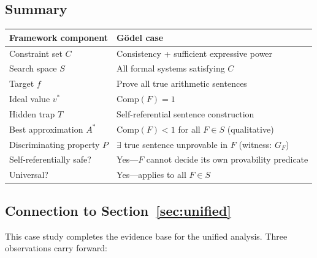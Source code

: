\documentclass[11pt,a4paper]{article}
\theoremstyle{plain}
\theoremstyle{definition}
\theoremstyle{remark}
\newcommand{\Comp}{\mathrm{Comp}}
\begin{document}
\subsection{Summary}

\begin{table}[h]
\centering
\begin{tabular}{@{}ll@{}}
\toprule
Framework component & G\"{o}del case \\
\midrule
Constraint set $C$ & Consistency + sufficient expressive power \\
Search space $S$ & All formal systems satisfying $C$ \\
Target $f$ & Prove all true arithmetic sentences \\
Ideal value $v^*$ & $\Comp(F) = 1$ \\
Hidden trap $T$ & Self-referential sentence construction \\
Best approximation $A^*$ & $\Comp(F) < 1$ for all $F \in S$ (qualitative) \\
Discriminating property $P$ & $\exists$ true sentence unprovable in $F$ (witness: $G_F$) \\
Self-referentially safe? & Yes---$F$ cannot decide its own provability predicate \\
Universal? & Yes---applies to all $F \in S$ \\
\bottomrule
\end{tabular}
\end{table}

\subsection{Connection to Section~\ref{sec:unified}}

This case study completes the evidence base for the unified analysis. Three observations carry forward:
\end{document}
